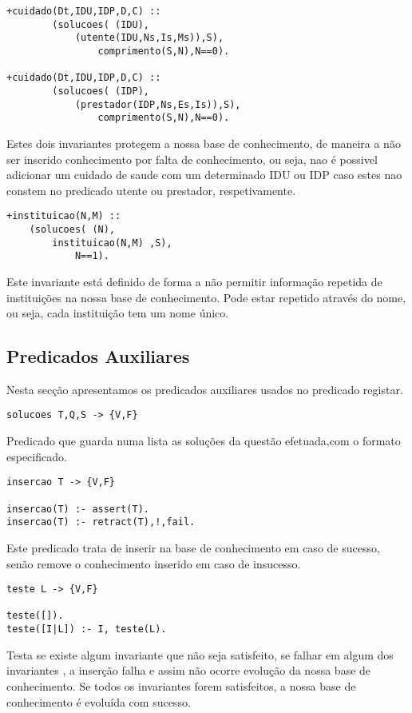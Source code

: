 \documentclass{report}
\begin{document}
\begin{verbatim}
+cuidado(Dt,IDU,IDP,D,C) :: 
        (solucoes( (IDU),
            (utente(IDU,Ns,Is,Ms)),S),
                comprimento(S,N),N==0).

+cuidado(Dt,IDU,IDP,D,C) :: 
        (solucoes( (IDP),
            (prestador(IDP,Ns,Es,Is)),S),
                comprimento(S,N),N==0).
\end{verbatim}
Estes dois invariantes protegem a nossa base de conhecimento, de maneira a não ser inserido conhecimento por falta de conhecimento, ou seja, nao é possivel adicionar um cuidado de saude com um determinado IDU ou IDP caso estes nao constem no predicado utente ou prestador, respetivamente.
\bigbreak

\begin{verbatim}
+instituicao(N,M) :: 
    (solucoes( (N), 
        instituicao(N,M) ,S), 
            N==1).
\end{verbatim}
Este invariante está definido de forma a não permitir informação repetida de instituições na nossa base de conhecimento. Pode estar repetido através do nome, ou seja, cada instituição tem um nome único.
\bigbreak

\subsection{Predicados Auxiliares}

Nesta secção apresentamos os predicados auxiliares usados no predicado registar.


\begin{verbatim}
solucoes T,Q,S -> {V,F}
\end{verbatim}

Predicado que guarda numa lista as soluções da questão efetuada,com o formato especificado.

\begin{verbatim}
insercao T -> {V,F}

insercao(T) :- assert(T).
insercao(T) :- retract(T),!,fail.
\end{verbatim}

Este predicado trata de inserir na base de conhecimento em caso de sucesso, senão remove o conhecimento inserido em caso de insucesso.

\begin{verbatim}
teste L -> {V,F}

teste([]).
teste([I|L]) :- I, teste(L).
\end{verbatim}

Testa se existe algum invariante que não seja satisfeito, se falhar em algum dos invariantes , a inserção falha e assim não ocorre evolução da nossa base de conhecimento. Se todos os invariantes forem satisfeitos, a nossa base de conhecimento é evoluída com sucesso.
\end{document}
